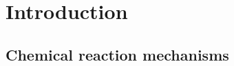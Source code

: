 \chapter{Introduction}%
\label{ch:introduction}

\lipsum[1]

\section{Chemical reaction mechanisms}

\lipsum[2]
